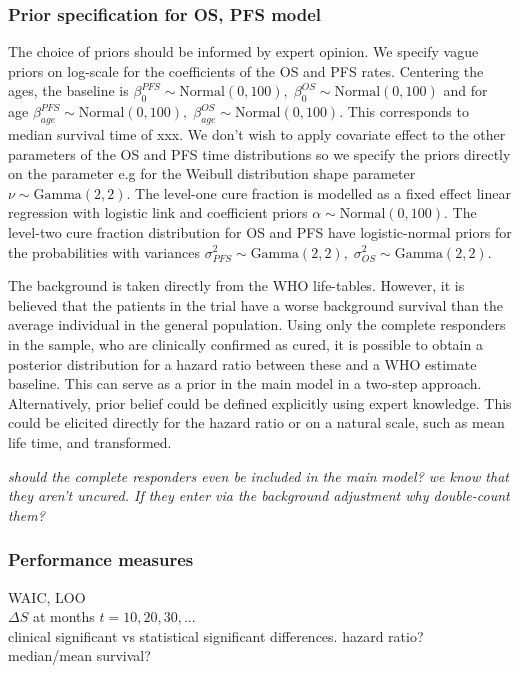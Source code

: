 \documentclass[AMA,STIX1COL]{WileyNJD-v2}
\begin{document}
\subsubsection{Prior specification for OS, PFS model}
The choice of priors should be informed by expert opinion.
We specify vague priors on log-scale for the coefficients of the OS and PFS rates.
Centering the ages, the baseline is $\beta_0^{PFS} \sim \text{Normal}(0, 100),\; \beta_0^{OS} \sim \text{Normal}(0, 100)$
and for age $\beta_{age}^{PFS} \sim \text{Normal}(0, 100),\; \beta_{age}^{OS} \sim \text{Normal}(0, 100)$.
This corresponds to median survival time of xxx.
We don't wish to apply covariate effect to the other parameters of the OS and PFS time distributions so we specify the priors directly on the parameter
e.g for the Weibull distribution shape parameter $\nu \sim \text{Gamma}(2, 2)$. 
The level-one cure fraction is modelled as a fixed effect linear regression with logistic link and coefficient priors $\alpha \sim \text{Normal}(0, 100)$.
The level-two cure fraction distribution for OS and PFS have logistic-normal priors for the probabilities with variances
$\sigma^2_{PFS} \sim \text{Gamma}(2, 2),\; \sigma^2_{OS} \sim \text{Gamma}(2, 2)$.


The background is taken directly from the WHO life-tables.
However, it is believed that the patients in the trial have a worse background survival than the average individual in the general population.
Using only the complete responders in the sample, who are clinically confirmed as cured, it is possible to obtain a posterior distribution for a hazard ratio between these and a WHO estimate baseline.
This can serve as a prior in the main model in a two-step approach.
Alternatively, prior belief could be defined explicitly using expert knowledge.
This could be elicited directly for the hazard ratio or on a natural scale, such as mean life time, and transformed.

{\it should the complete responders even be included in the main model? we know that they aren't uncured. If they enter via the background adjustment why double-count them?}


\subsubsection{Performance measures}
WAIC, LOO\\
$\Delta S$ at months $t = 10, 20, 30, ...$\\
clinical significant vs statistical significant differences.
hazard ratio?\\
median/mean survival?
\end{document}
